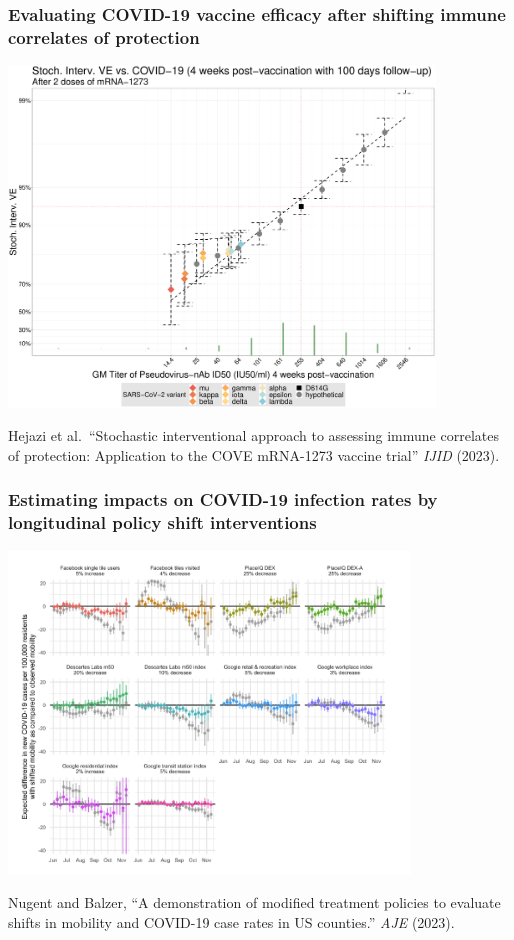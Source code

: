 \documentclass[t]{beamer}
\begin{document}
\begin{frame}
  \frametitle{Evaluating COVID-19 vaccine efficacy after shifting immune
  correlates of protection}
  \vspace{-2em}
  \begin{center}
  \includegraphics[width=0.85\textwidth]
  {figures/sve_pseudoneutid50_immunobridging_2dose.pdf}\hspace*{4cm}
  \end{center}
  \scriptsize{
  Hejazi et al.~``Stochastic interventional approach to assessing immune
  correlates of protection: Application to the COVE mRNA-1273 vaccine trial''
  \textit{IJID} (2023).}
\end{frame}

\begin{frame}
  \frametitle{Estimating impacts on COVID-19 infection rates by longitudinal
  policy shift interventions}
  \vspace{-2em}
  \begin{center}
  \includegraphics[width=0.8\textwidth] {figures/BalzerShift2023.png}\hspace*{4cm}
  \end{center}
  \scriptsize{
  Nugent and Balzer, ``A demonstration of modified treatment policies to
  evaluate shifts in mobility and COVID-19 case rates in US counties.''
  \textit{AJE} (2023).}
\end{frame}
\end{document}
